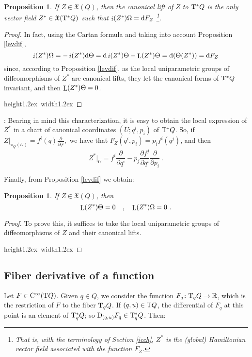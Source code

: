 \documentclass[12pt]{report}
\newtheorem{prop}[teor]{Proposition}
\def\beq{\begin{equation}}
\def\eeq{\end{equation}}
\def\derpar#1#2{\frac{\partial{#1}}{\partial{#2}}}
\def\qed{\ifvmode\removelastskip\fi
{\unskip\nobreak\hfil\penalty50\hbox{}\nobreak\hfil
\hbox{\vrule height1.2ex width1.2ex}\parfillskip=0pt
\finalhyphendemerits=0 \par\smallskip}}
\def\vf{\mathfrak X}
\def\d{{\rm d}}
\def\Real{\mathbb{R}}
\def\Tan{{\rm T}}
\def\Lie{\mathop{\rm L}\nolimits}
\def\inn{\mathop{i}\nolimits}
\def\Cinfty{{\rm C}^\infty}
\begin{document}
\begin{prop}
If $Z\in\vf (Q)$, then the canonical lift of $Z$ to $\Tan^*Q$
is the only vector field $Z^*\in\vf (\Tan^*Q)$ such that
$\inn (Z^*)\Omega =\d F_Z$
\footnote{
That is, with the terminology of Section \ref{icch},
$Z^*$ is the  (global) Hamiltonian vector field associated with the function $F_Z$.}.
\label{hamlev}
\end{prop}
\begin{proof}
In fact, using the Cartan formula and taking into account Proposition \ref{levdif},
$$
\inn (Z^*)\Omega =-\inn (Z^*)\d\Theta =
\d\inn (Z^*)\Theta -\Lie (Z^*)\Theta =\d (\Theta (Z^*))=\d F_Z
$$
since, according to Proposition \ref{levdif},
as the local uniparametric groups of diffeomorphisms of $Z^*$
are canonical lifts, 
they let  the canonical forms of $\Tan^*Q$ invariant, and then
$\Lie (Z^*)\Theta =0$.
\\ \qed \end{proof}

:
Bearing in mind this characterization, it is easy to obtain the local expression
of $Z^*$ in a chart of canonical coordinates 
$(U;q^i,p_i)$ of $\Tan^*Q$. So, if
\ $\displaystyle Z\vert_{\pi_Q (U)}=f^i(q)\derpar{}{q^i}$,\
we have that $F_Z(q^i,p_i)=p_if^i(q^j)$, and then
\beq
Z^*\vert_U=f^i\derpar{}{q^i}-p_j\derpar{f^j}{q^i}\derpar{}{p_i} \ .
\label{canlifcot}
\eeq

Finally, from Proposition \ref{levdif} we obtain:

\begin{prop}
If $Z\in\vf (Q)$, then
$$
\Lie(Z^*)\Theta=0 \quad , \quad
\Lie(Z^*)\Omega=0 \ .
$$
\label{inf}
\end{prop}
\begin{proof}
To prove this, it suffices to take the local uniparametric groups of diffeomorphisms 
of $Z$ and their canonical lifts.
\\ \qed \end{proof}


\subsection{Fiber derivative of a function}


Let $F\in\Cinfty(\Tan Q)$.
Given $q \in Q$, we consider the function $F_q \colon \Tan_qQ \to \Real$, 
which is the restriction of $F$ to the fiber $\Tan_qQ$.
If $(q,u)\in \Tan Q$, the differential of $F_q$ at this point
is an element of $\Tan_q^*Q$; so ${\rm D}_{(q,u)}F_q \in \Tan^*_qQ$. Then:
\end{document}
